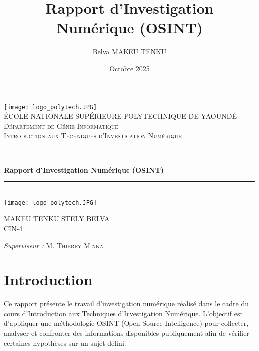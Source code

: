 \documentclass[a4paper,12pt]{report}
\title{Rapport d'Investigation Numérique (OSINT)}
\author{Belva MAKEU TENKU}
\date{Octobre 2025}
\newcommand{\HRule}{\rule{\linewidth}{0.5mm}}
\begin{document}
\begin{titlepage}
	\begin{sffamily}
		\begin{center}
			\texttt{[image: logo\_polytech.JPG]}~\\[1.5cm]
			\textsc{\LARGE ÉCOLE NATIONALE SUPÉRIEURE POLYTECHNIQUE DE YAOUNDÉ}\\[2cm]
			\textsc{\Large Département de Génie Informatique}\\[2cm]
			\textsc{\large Introduction aux Techniques d'Investigation Numérique}\\[1.5cm]
			\HRule \\[0.4cm]
			{ \huge \bfseries Rapport d'Investigation Numérique (OSINT)\\[0.4cm] }
			\HRule \\[2cm]
			\texttt{[image: logo\_polytech.JPG]} \\[2cm]
			\begin{minipage}{0.4\textwidth}
				\begin{flushleft} \large
					MAKEU TENKU STELY BELVA\\
					CIN-4\\
				\end{flushleft}
			\end{minipage}
			\begin{minipage}{0.4\textwidth}
				\begin{flushright} \large
					\emph{Superviseur :} M. \textsc{Thierry Minka}\\
				\end{flushright}
			\end{minipage}
			\vfill
		\end{center}
	\end{sffamily}
\end{titlepage}

\tableofcontents
\newpage

\chapter*{Introduction}

Ce rapport présente le travail d’investigation numérique réalisé dans le cadre du cours d’Introduction aux Techniques d’Investigation Numérique.  
L’objectif est d’appliquer une méthodologie OSINT (Open Source Intelligence) pour collecter, analyser et confronter des informations disponibles publiquement afin de vérifier certaines hypothèses sur un sujet défini.
\end{document}
